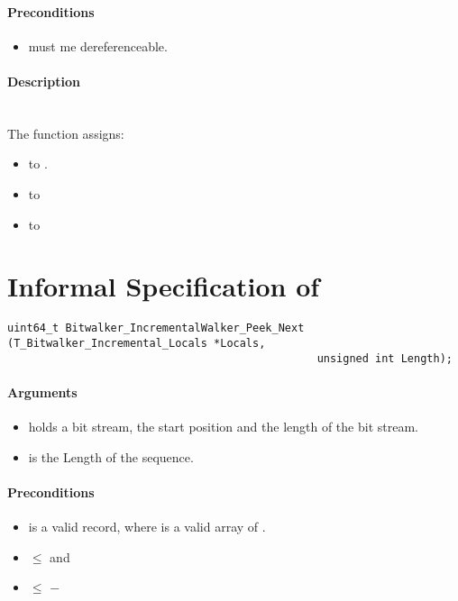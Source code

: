 \paragraph{Preconditions}
\begin{itemize}
    \item  {} must me dereferenceable.
\end{itemize}

\paragraph{Description}\hfill\\\hfill
The function \init assigns:
\begin{itemize}
    \item {}  to .
    \item {} to 
    \item {} to 
\end{itemize}

\clearpage

\section{Informal Specification of }

\begin{lstlisting}[style=acsl-block]
uint64_t Bitwalker_IncrementalWalker_Peek_Next (T_Bitwalker_Incremental_Locals *Locals,
                                                unsigned int Length);
\end{lstlisting}


\paragraph{Arguments}
\begin{itemize}
    \item  {} holds a bit stream, the start position and the length of the bit stream.
   \item {} is the Length of the sequence.
\end{itemize}

\paragraph{Preconditions}
\begin{itemize}
    \item  {} is a valid record, where  is a valid array of .
    \item {} $\leq$  and
    \item {} $\leq $  $-$ 
\end{itemize}

